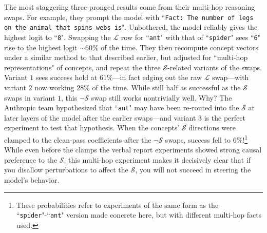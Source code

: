 \documentclass{article}
\newcommand{\jlens}{\mathscr{L}}
\newcommand{\jspace}{\mathscr{S}}
\begin{document}
The most staggering three-pronged results come from their multi-hop reasoning swaps. For example, they prompt the model with ``\texttt{Fact: The number of legs on the animal that spins webs is}". Unbothered, the model reliably gives the highest logit to ``\texttt{8}". Swapping the \(\jlens\) row for ``\texttt{ant}" with that of ``\texttt{spider}" sees ``\texttt{6}" rise to the highest logit \(\sim 60\%\) of the time. They then recompute concept vectors under a similar method to that described earlier, but adjusted for ``multi-hop representations" of concepts, and repeat the three \(\jspace\)-related variants of the swaps. Variant \(1\) sees success hold at \(61\%\)---in fact edging out the raw \(\jlens\) swap---with variant \(2\) now working \(28\%\) of the time. While still half as successful as the \(\jspace\) swaps in variant \(1\), this \(\neg\jspace\) swap still works nontrivially well. Why? The Anthropic team hypothesized that ``\texttt{ant}" may have been re-routed into the \(\jspace\) at later layers of the model after the earlier swaps---and variant \(3\) is the perfect experiment to test that hypothesis. When the concepts' \(\jspace\) directions were clamped to the clean-pass coefficients after the \(\neg\jspace\) swaps, success fell to \(6\%\)!\footnote{These probabilities refer to experiments of the same form as the ``\texttt{spider}"-``\texttt{ant}" version made concrete here, but with different multi-hop facts used.} While even before the clamps the verbal report experiments showed strong causal preference to the \(\jspace\), this multi-hop experiment makes it decisively clear that if you disallow perturbations to affect the \(\jspace\), you will not succeed in steering the model's behavior. 
\end{document}
